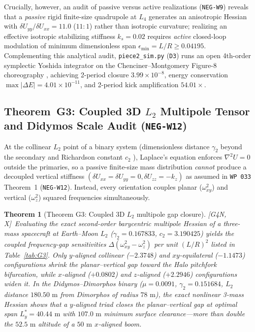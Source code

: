 \documentclass[11pt]{amsart}
\numberwithin{equation}{section}
\theoremstyle{plain}
\newtheorem{theorem}{Theorem}[section]
\theoremstyle{definition}\newtheorem{definition}[theorem]{Definition}
\theoremstyle{remark}\newtheorem{remark}[theorem]{Remark}
\newcommand{\ctag}[1]{\textup{\textsf{\scriptsize[#1]}}}
\begin{document}
Crucially, however, an audit of passive versus active realizations (\texttt{NEG-W9}) reveals that a \emph{passive} rigid finite-size quadrupole at $L_4$ generates an anisotropic Hessian with $\delta U_{yy}/\delta U_{xx} = 11.0$ ($11:1$) rather than isotropic curvature; realizing an effective isotropic stabilizing stiffness $k_s = 0.02$ requires \emph{active} closed-loop modulation of minimum dimensionless span $\epsilon_{\min} = L/R \ge 0.04195$. Complementing this analytical audit, \texttt{piece2\_sim.py} (\texttt{D3}) runs an open 4th-order symplectic Yoshida integrator \cite{yoshida1990} on the Chenciner--Montgomery Figure-8 choreography \cite{chenciner2000}, achieving 2-period closure $3.99\times 10^{-8}$, energy conservation $\max|\Delta E| = 4.01\times 10^{-11}$, and 2-period kick amplification $54.01\times$.

\subsection{Theorem~G3: Coupled 3D \texorpdfstring{$L_2$}{L2} Multipole Tensor and Didymos Scale Audit (\texttt{NEG-W12})}
At the collinear $L_2$ point of a binary system (dimensionless distance $\gamma_2$ beyond the secondary and Richardson constant $c_2$ \cite{richardson1980}), Laplace's equation enforces $\nabla^2 U = 0$ outside the primaries, so a passive finite-size mass distribution \emph{cannot} produce a decoupled vertical stiffness $(\delta U_{xx}=\delta U_{yy}=0, \delta U_{zz}=-k_z)$ as assumed in \texttt{WP~033} Theorem~1 (\texttt{NEG-W12}). Instead, every orientation couples planar ($\omega_{xy}^2$) and vertical ($\omega_z^2$) squared frequencies simultaneously.

\begin{theorem}[Theorem G3: Coupled 3D $L_2$ multipole gap closure]\label{thm:G3}
\ctag{G4N, X}\ Evaluating the exact second-order barycentric multipole Hessian of a three-mass spacecraft at Earth--Moon $L_2$ ($\gamma_2 = 0.167833$, $c_2 = 3.190425$) yields the coupled frequency-gap sensitivities $\Delta(\omega_{xy}^2 - \omega_z^2)$ per unit $(L/R)^2$ listed in Table~\ref{tab:G3}. Only $y$-aligned collinear ($-2.3748$) and $xy$-equilateral ($-1.1473$) configurations shrink the planar--vertical gap toward the Halo pitchfork bifurcation, while $x$-aligned ($+0.0802$) and $z$-aligned ($+2.2946$) configurations widen it. In the Didymos--Dimorphos binary ($\mu = 0.0091$, $\gamma_2 = 0.151684$, $L_2$ distance $180.50\text{ m}$ from Dimorphos of radius $78\text{ m}$), the exact nonlinear 3-mass Hessian shows that a $y$-aligned triad closes the planar--vertical gap at optimal span $L_y^* = 40.44\text{ m}$ with $107.0\text{ m}$ minimum surface clearance---more than double the $52.5\text{ m}$ altitude of a $50\text{ m}$ $x$-aligned boom.
\end{theorem}
\end{document}
